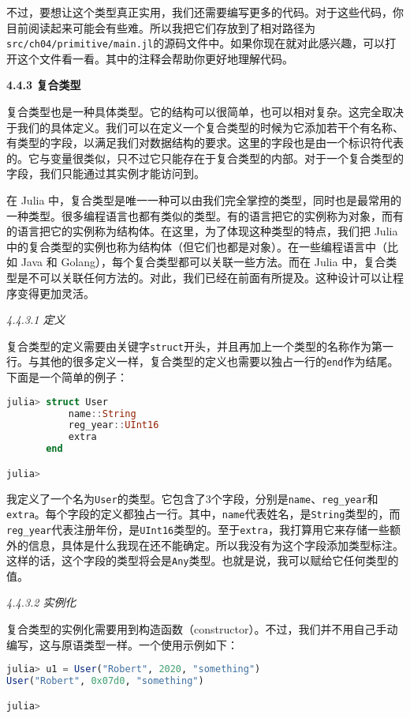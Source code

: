 不过，要想让这个类型真正实用，我们还需要编写更多的代码。对于这些代码，你目前阅读起来可能会有些难。所以我把它们存放到了相对路径为\verb|src/ch04/primitive/main.jl|的源码文件中。如果你现在就对此感兴趣，可以打开这个文件看一看。其中的注释会帮助你更好地理解代码。

\textbf{4.4.3 复合类型}

复合类型也是一种具体类型。它的结构可以很简单，也可以相对复杂。这完全取决于我们的具体定义。我们可以在定义一个复合类型的时候为它添加若干个有名称、有类型的字段，以满足我们对数据结构的要求。这里的字段也是由一个标识符代表的。它与变量很类似，只不过它只能存在于复合类型的内部。对于一个复合类型的字段，我们只能通过其实例才能访问到。

在 Julia 中，复合类型是唯一一种可以由我们完全掌控的类型，同时也是最常用的一种类型。很多编程语言也都有类似的类型。有的语言把它的实例称为对象，而有的语言把它的实例称为结构体。在这里，为了体现这种类型的特点，我们把 Julia 中的复合类型的实例也称为结构体（但它们也都是对象）。在一些编程语言中（比如 Java 和 Golang），每个复合类型都可以关联一些方法。而在 Julia 中，复合类型是不可以关联任何方法的。对此，我们已经在前面有所提及。这种设计可以让程序变得更加灵活。

\textsl{4.4.3.1 定义}

复合类型的定义需要由关键字\verb|struct|开头，并且再加上一个类型的名称作为第一行。与其他的很多定义一样，复合类型的定义也需要以独占一行的\verb|end|作为结尾。下面是一个简单的例子：

\begin{lstlisting}[language=julia]
julia> struct User
           name::String
           reg_year::UInt16
           extra
       end

julia> 
\end{lstlisting}

我定义了一个名为\verb|User|的类型。它包含了3个字段，分别是\verb|name|、\verb|reg_year|和\verb|extra|。每个字段的定义都独占一行。其中，\verb|name|代表姓名，是\verb|String|类型的，而\verb|reg_year|代表注册年份，是\verb|UInt16|类型的。至于\verb|extra|，我打算用它来存储一些额外的信息，具体是什么我现在还不能确定。所以我没有为这个字段添加类型标注。这样的话，这个字段的类型将会是\verb|Any|类型。也就是说，我可以赋给它任何类型的值。

\textsl{4.4.3.2 实例化}

复合类型的实例化需要用到构造函数（constructor）。不过，我们并不用自己手动编写，这与原语类型一样。一个使用示例如下：

\begin{lstlisting}[language=julia]
julia> u1 = User("Robert", 2020, "something")
User("Robert", 0x07d0, "something")

julia> 
\end{lstlisting}

